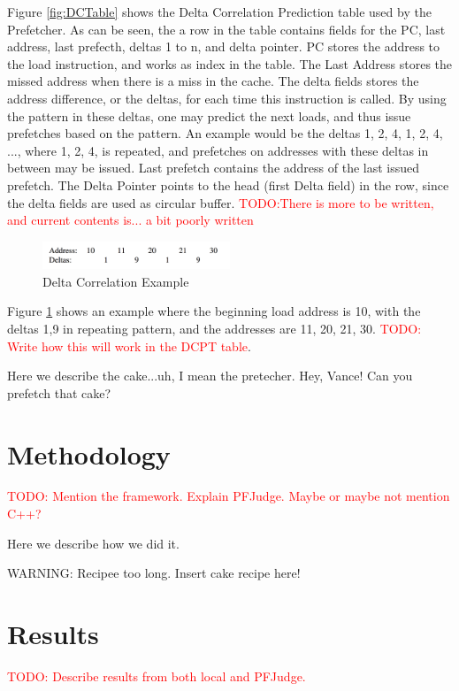 \documentclass[a4paper]{IEEEtran}
\newcommand\TODO[1]{\textcolor{red}{TODO:#1}}
\newcommand\todo[1]{\TODO{#1}}
\begin{document}
\break
Figure \ref{fig:DCTable} shows the Delta Correlation Prediction table used by the Prefetcher. As can be seen, the a row in the table contains fields for the PC, last address, last prefecth, deltas 1 to n, and delta pointer. PC stores the address to the load instruction, and works as index in the table. The Last Address stores the missed address when there is a miss in the cache. The delta fields stores the address difference, or the deltas, for each time this instruction is called. By using the pattern in these deltas, one may predict the next loads, and thus issue prefetches based on the pattern. An example would be the deltas 1, 2, 4, 1, 2, 4, ..., where 1, 2, 4, is repeated, and prefetches on addresses with these deltas in between may be issued. Last prefetch contains the address of the last issued prefetch. The Delta Pointer points to the head (first Delta field) in the row, since the delta fields are used as circular buffer.
\todo{There is more to be written, and current contents is... a bit poorly written}

\begin{figure}[h!]
  \centering
      \includegraphics[width=0.5\textwidth]{Figures/DCExample}
  \caption{Delta Correlation Example}
  \label{fig:DCExample}
\end{figure}

\break
Figure \ref{fig:DCExample} shows an example where the beginning load address is 10, with the deltas 1,9 in repeating pattern, and the addresses are 11, 20, 21, 30. 
\todo{ Write how this will work in the DCPT table}.


Here we describe the cake...uh, I mean the pretecher. Hey, Vance! Can you prefetch that cake?
\section{Methodology}
\todo{ Mention the framework. Explain PFJudge. Maybe or maybe not mention C++?}
\break

Here we describe how we did it.

WARNING: Recipee too long. Insert cake recipe here!
\section{Results}
\todo{ Describe results from both local and PFJudge.}
\break
\end{document}

